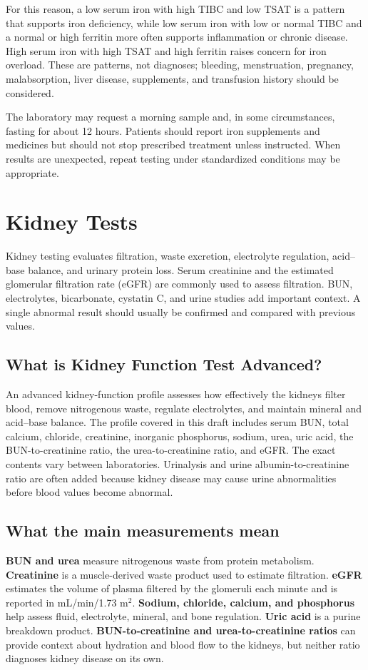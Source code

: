 \documentclass[11pt,openany]{book}
\begin{document}
For this reason, a low serum iron with high TIBC and low TSAT is a pattern that
supports iron deficiency, while low serum iron with low or normal TIBC and a
normal or high ferritin more often supports inflammation or chronic disease.
High serum iron with high TSAT and high ferritin raises concern for iron
overload. These are patterns, not diagnoses; bleeding, menstruation, pregnancy,
malabsorption, liver disease, supplements, and transfusion history should be
considered.

The laboratory may request a morning sample and, in some circumstances, fasting
for about 12 hours. Patients should report iron supplements and medicines but
should not stop prescribed treatment unless instructed. When results are
unexpected, repeat testing under standardized conditions may be appropriate.

\section{Kidney Tests}

Kidney testing evaluates filtration, waste excretion, electrolyte regulation,
acid--base balance, and urinary protein loss. Serum creatinine and the
estimated glomerular filtration rate (eGFR) are commonly used to assess
filtration. BUN, electrolytes, bicarbonate, cystatin C, and urine studies add
important context. A single abnormal result should usually be confirmed and
compared with previous values.

\subsection*{What is Kidney Function Test Advanced?}
An advanced kidney-function profile assesses how effectively the kidneys filter
blood, remove nitrogenous waste, regulate electrolytes, and maintain mineral
and acid--base balance. The profile covered in this draft includes serum BUN,
total calcium, chloride, creatinine, inorganic phosphorus, sodium, urea, uric
acid, the BUN-to-creatinine ratio, the urea-to-creatinine ratio, and eGFR. The
exact contents vary between laboratories. Urinalysis and urine
albumin-to-creatinine ratio are often added
because kidney disease may cause urine abnormalities before blood values become
abnormal.

\subsection*{What the main measurements mean}
\textbf{BUN and urea} measure nitrogenous waste from protein metabolism.
\textbf{Creatinine} is a muscle-derived waste product used to estimate
filtration. \textbf{eGFR} estimates the volume of plasma filtered by the
glomeruli each minute and is reported in mL/min/1.73 m$^2$. \textbf{Sodium,
chloride, calcium, and phosphorus} help assess fluid, electrolyte, mineral,
and bone regulation. \textbf{Uric acid} is a purine breakdown product.
\textbf{BUN-to-creatinine and urea-to-creatinine ratios} can provide context
about hydration and blood flow to the kidneys, but neither ratio diagnoses
kidney disease on its own.
\end{document}
